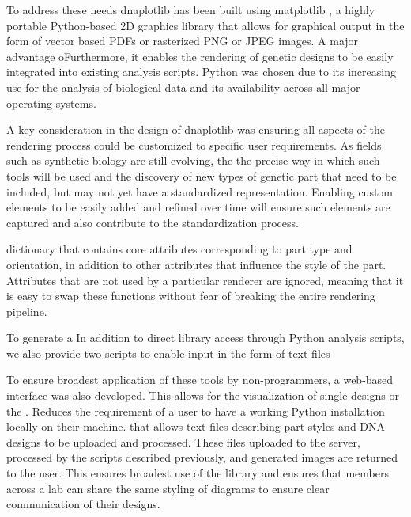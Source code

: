 \documentclass{bioinfo}
\begin{document}
To address these needs dnaplotlib has been built using matplotlib \citep{Hunter07a}, a highly portable Python-based 2D graphics library that allows for graphical output in the form of vector based PDFs or rasterized PNG or JPEG images. A major advantage oFurthermore, it enables the rendering of genetic designs to be easily integrated into existing analysis scripts. Python was chosen due to its increasing use for the analysis of biological data \citep{Cock09a} and its availability across all major operating systems.

A key consideration in the design of dnaplotlib was ensuring all aspects of the rendering process could be customized to specific user requirements. As fields such as synthetic biology are still evolving, the the precise way in which such tools will be used and the discovery of new types of genetic part that need to be included, but may not yet have a standardized representation. Enabling custom elements to be easily added and refined over time will ensure such elements are captured and also contribute to the standardization process. 

dictionary that contains core attributes corresponding to part type and orientation, in addition to other attributes that influence the style of the part. Attributes that are not used by a particular renderer are ignored, meaning that it is easy to swap these functions without fear of breaking the entire rendering pipeline.

To generate a 
In addition to direct library access through Python analysis scripts, we also provide two scripts to enable input in the form of text files

To ensure broadest application of these tools by non-programmers, a web-based interface was also developed. This allows for the visualization of single designs or the . Reduces the requirement of a user to have a working Python installation locally on their machine.
that allows text files describing part styles and DNA designs to be uploaded and processed. These files uploaded to the server, processed by the scripts described previously, and generated images are returned to the user. This ensures broadest use of the library and ensures that members across a lab can share the same styling of diagrams to ensure clear communication of their designs.
\end{document}

